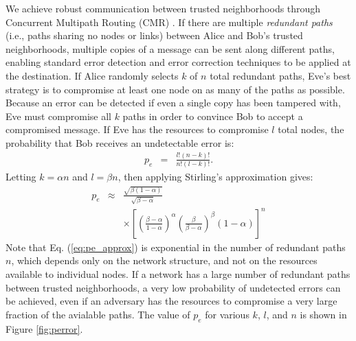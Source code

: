 \documentclass[twocolumn]{article}
\newcommand{\beq}{\begin{eqnarray}}
\newcommand{\eeq}{\end{eqnarray}}
\begin{document}
We achieve robust communication between trusted neighborhoods through
Concurrent Multipath Routing (CMR) \cite{}.
If there are multiple {\em redundant paths} (i.e., paths sharing no nodes or
links) between Alice and Bob's trusted neighborhoods, multiple copies of a
message can be sent along different paths, enabling standard error detection and
error correction techniques to be applied at the destination.
If Alice randomly selects $k$ of $n$ total redundant paths, Eve's best strategy
is to compromise at least one node on as many of the paths as possible.
Because an error can be detected if even a single copy has been tampered with,
Eve must compromise all $k$ paths in order to convince Bob to accept a compromised
message.
If Eve has the resources to compromise $l$ total nodes, the probability that
Bob receives an undetectable error is:
\beq
\label{eq:pe}
p_e &=& \frac{l!(n-k)!}{n!(l-k)!}.
\eeq
Letting $k=\alpha n$ and $l=\beta n$, then applying Stirling's
approximation gives:
\begin{eqnarray}
\nonumber
p_e &\approx&
\frac{\sqrt{\beta(1-\alpha)}}{\sqrt{\beta-\alpha}} \\
& &
\times {}
\label{eq:pe_approx}
\left[
    \left( \frac{\beta-\alpha}{1-\alpha} \right)^{\alpha}
    \left( \frac{\beta}{\beta-\alpha} \right)^{\beta}
    (1-\alpha)
\right]^n
\end{eqnarray}
Note that Eq. (\ref{eq:pe_approx}) is exponential in the number of redundant
paths $n$, which depends only on the network structure, and not on the
resources available to individual nodes.
If a network has a large number of redundant paths between trusted neighborhoods,
a very low probability of undetected errors can be achieved, even if an adversary
has the resources to compromise a very large fraction of the avialable paths.
The value of $p_e$ for various $k$, $l$, and $n$ is shown in Figure
\ref{fig:perror}.
\end{document}

